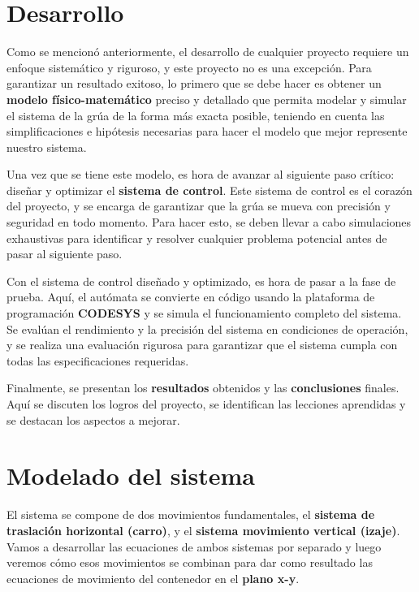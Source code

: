 \documentclass[11pt]{article}
\begin{document}
\newpage


\section{Desarrollo}
Como se mencionó anteriormente, el desarrollo de cualquier proyecto requiere un enfoque sistemático y riguroso, y este proyecto no es una excepción. Para garantizar un resultado exitoso, lo primero que se debe hacer es obtener un \textbf{modelo físico-matemático} preciso y detallado que permita modelar y simular el sistema de la grúa de la forma más exacta posible, teniendo en cuenta las simplificaciones e hipótesis necesarias para hacer el modelo que mejor represente nuestro sistema.
\par
Una vez que se tiene este modelo, es hora de avanzar al siguiente paso crítico: diseñar y optimizar el \textbf{sistema de control}. Este sistema de control es el corazón del proyecto, y se encarga de garantizar que la grúa se mueva con precisión y seguridad en todo momento. Para hacer esto, se deben llevar a cabo simulaciones exhaustivas para identificar y resolver cualquier problema potencial antes de pasar al siguiente paso.
\par
Con el sistema de control diseñado y optimizado, es hora de pasar a la fase de prueba. Aquí, el autómata se convierte en código usando la plataforma de programación \textbf{CODESYS} y se simula el funcionamiento completo del sistema. Se evalúan el rendimiento y la precisión del sistema en condiciones de operación, y se realiza una evaluación rigurosa para garantizar que el sistema cumpla con todas las especificaciones requeridas.
\par
Finalmente, se presentan los \textbf{resultados} obtenidos y las \textbf{conclusiones} finales. Aquí se discuten los logros del proyecto, se identifican las lecciones aprendidas y se destacan los aspectos a mejorar.

\section{Modelado del sistema}

El sistema se compone de dos movimientos fundamentales, el \textbf{sistema de traslación horizontal (carro)}, y el \textbf{sistema movimiento vertical (izaje)}. Vamos a desarrollar las ecuaciones de ambos sistemas por separado y luego veremos cómo esos movimientos se combinan para dar como resultado las ecuaciones de movimiento del contenedor en el \textbf{plano x-y}.
\end{document}
